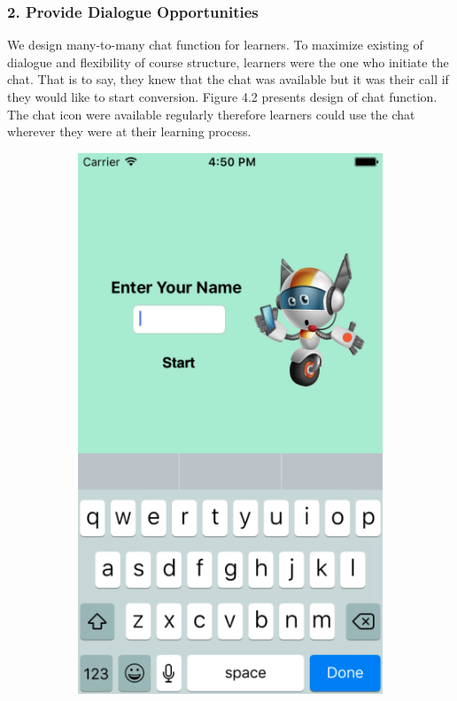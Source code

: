 \newpage 
\subsubsection{2. Provide Dialogue Opportunities}
We design many-to-many chat function for learners. To maximize existing of dialogue and flexibility of course structure, learners were the one who initiate the chat. That is to say, they knew that the chat was available but it was their call if they would like to start conversion. Figure 4.2 presents design of chat function. The chat icon were available regularly therefore learners could use the chat wherever they were at their learning process. 

\begin{figure}[H]\centering
    \begin{subfigure}{0.27\textwidth}
\includegraphics[width=\textwidth]{chat1}

\end{subfigure}
\end{figure}
